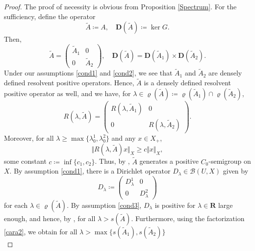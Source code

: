 \documentclass[a4paper,11pt,reqno]{amsart}
\def\la{\lambda}
\def\R{\mathbf{R}}
\theoremstyle{plain}
\numberwithin{equation}{section}
\begin{document}
\begin{proof}
The proof of necessity is obvious from Proposition \ref{Spectrum}. For the sufficiency, define the operator
\begin{equation*}
\tilde{A}\coloneqq A,\quad \bm{D}(\tilde{A})\coloneqq \ker G.
\end{equation*}
Then,
\begin{equation*}
\tilde{A}=\left(\begin{matrix}
\tilde{A}_{1} & 0 \\
0 & \tilde{A}_{2}
\end{matrix}\right), \quad \bm{D}(\tilde{A})=\bm{D}(\tilde{A}_1)\times \bm{D}(\tilde{A}_2).
\end{equation*}
Under our assumptions \ref{cond1} and \ref{cond2}, we see that $\tilde{A}_1$ and $\tilde{A}_2$ are densely defined resolvent positive operators. Hence, $\tilde{A}$ is a densely defined resolvent positive operator as well, and we have, for $\la \in \varrho(\tilde{A})\coloneqq\varrho(\tilde{A}_1)\cap \varrho(\tilde{A}_2)$,
\begin{equation*}
R(\lambda,\tilde{A})=\left(\begin{matrix}R(\lambda,\tilde{A}_1) & 0\\ 0 & R(\lambda,\tilde{A}_2)\end{matrix}\right).
\end{equation*}
Moreover, for all $\lambda \ge \max\{\lambda_0^1,\lambda_0^2\}$ and any $x\in X_+$,
\begin{equation*}
\Vert R(\lambda, \tilde{A})x \Vert_X \geq c \Vert x \Vert_X,
\end{equation*}
some constant $c\coloneqq \inf\{c_1,c_2\}$. Thus, by \cite[Theorem 2.5]{MR872810}, $\tilde{A}$ generates a positive $C_0$-semigroup on $X$. By assumption \ref{cond1}, there is a Dirichlet operator $D_\la\in \mathcal{B}(U,X)$ given by
\begin{equation*}
D_\la\coloneqq\left(\begin{matrix}
D_\la^{1} & 0 \\
0 & D_\la^{2}
\end{matrix}\right)
\end{equation*}
for each $\la \in \varrho(\tilde{A})$. By assumption \ref{cond3}, $D_\la$ is positive for $\lambda\in \R$ large enough, and hence, by \cite[Proposition 4.3]{MR4910475}, for all $\lambda>s(\tilde{A})$. Furthermore, using the factorization \eqref{cara2}, we obtain for all $\la >\max\{s(\tilde{A}_1),s(\tilde{A}_2)\}$
\begin{equation*}

\end{equation*}
\end{proof}
\end{document}
